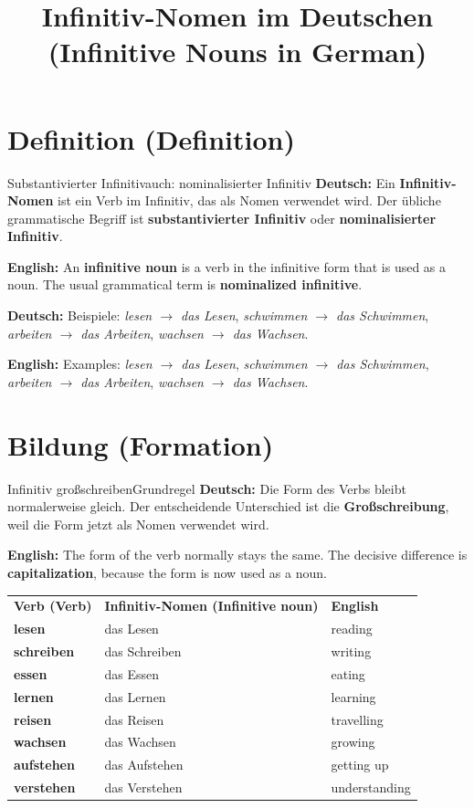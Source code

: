 \documentclass[a4paper,11pt]{article}
\title{Infinitiv-Nomen im Deutschen\\\large\textnormal{(Infinitive Nouns in German)}}
\date{}
\newcommand{\GermanText}[1]{\textbf{Deutsch: }#1\par}
\newcommand{\EnglishText}[1]{{\small\color{SoftGray}\textbf{English: }#1\par}}
\begin{document}
\maketitle
\tableofcontents
\newpage

\section{Definition \textnormal{(Definition)}}
\begin{grammarentry}{Substantivierter Infinitiv}{auch: nominalisierter Infinitiv}
\GermanText{Ein \textbf{Infinitiv-Nomen} ist ein Verb im Infinitiv, das als Nomen verwendet wird. Der übliche grammatische Begriff ist \textbf{substantivierter Infinitiv} oder \textbf{nominalisierter Infinitiv}.}
\EnglishText{An \textbf{infinitive noun} is a verb in the infinitive form that is used as a noun. The usual grammatical term is \textbf{nominalized infinitive}.}

\GermanText{Beispiele: \textit{lesen $\rightarrow$ das Lesen}, \textit{schwimmen $\rightarrow$ das Schwimmen}, \textit{arbeiten $\rightarrow$ das Arbeiten}, \textit{wachsen $\rightarrow$ das Wachsen}.}
\EnglishText{Examples: \textit{lesen $\rightarrow$ das Lesen}, \textit{schwimmen $\rightarrow$ das Schwimmen}, \textit{arbeiten $\rightarrow$ das Arbeiten}, \textit{wachsen $\rightarrow$ das Wachsen}.}
\end{grammarentry}

\section{Bildung \textnormal{(Formation)}}
\begin{grammarentry}{Infinitiv großschreiben}{Grundregel}
\GermanText{Die Form des Verbs bleibt normalerweise gleich. Der entscheidende Unterschied ist die \textbf{Großschreibung}, weil die Form jetzt als Nomen verwendet wird.}
\EnglishText{The form of the verb normally stays the same. The decisive difference is \textbf{capitalization}, because the form is now used as a noun.}
\end{grammarentry}

\begin{longtable}{>{\bfseries}p{3.4cm}|p{4.8cm}|p{5.2cm}}
\rowcolor{HeaderBlueDark}
\color{white}\textbf{Verb (Verb)} & \color{white}\textbf{Infinitiv-Nomen (Infinitive noun)} & \color{white}\textbf{English} \\
lesen & das Lesen & reading \\
schreiben & das Schreiben & writing \\
essen & das Essen & eating \\
lernen & das Lernen & learning \\
reisen & das Reisen & travelling \\
wachsen & das Wachsen & growing \\
aufstehen & das Aufstehen & getting up \\
verstehen & das Verstehen & understanding \\
\end{longtable}
\end{document}

